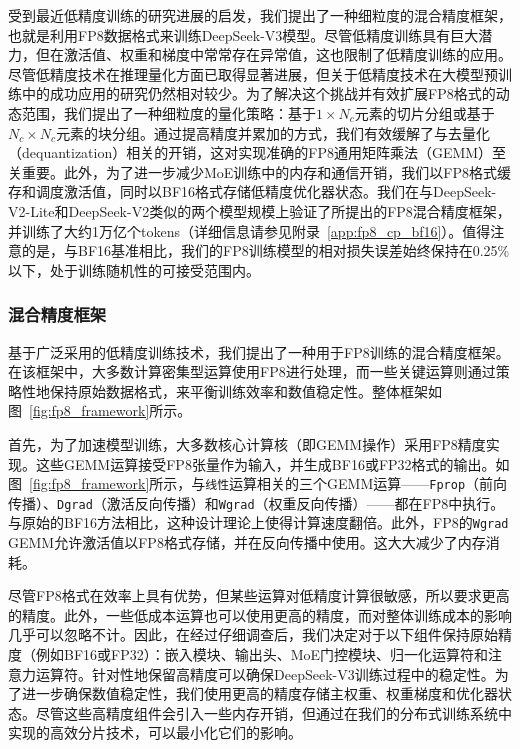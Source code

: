 \documentclass[lang=cn,a4paper,newtx]{elegantpaper}
\newcommand{\dsvii}{DeepSeek-V2}
\newcommand{\dsviii}{DeepSeek-V3}
\begin{document}
受到最近低精度训练的研究进展的启发，我们提出了一种细粒度的混合精度框架，也就是利用FP8数据格式来训练\dsviii{}模型。尽管低精度训练具有巨大潜力，但在激活值、权重和梯度中常常存在异常值，这也限制了低精度训练的应用。尽管低精度技术在推理量化方面已取得显著进展，但关于低精度技术在大模型预训练中的成功应用的研究仍然相对较少。为了解决这个挑战并有效扩展FP8格式的动态范围，我们提出了一种细粒度的量化策略：基于$1\times N_c$元素的切片分组或基于$N_c\times N_c$元素的块分组。通过提高精度并累加的方式，我们有效缓解了与去量化（dequantization）相关的开销，这对实现准确的FP8通用矩阵乘法（GEMM）至关重要。此外，为了进一步减少MoE训练中的内存和通信开销，我们以FP8格式缓存和调度激活值，同时以BF16格式存储低精度优化器状态。我们在与\dsvii{}-Lite和\dsvii{}类似的两个模型规模上验证了所提出的FP8混合精度框架，并训练了大约1万亿个tokens（详细信息请参见附录~\ref{app:fp8_cp_bf16}）。值得注意的是，与BF16基准相比，我们的FP8训练模型的相对损失误差始终保持在0.25\%以下，处于训练随机性的可接受范围内。

\subsubsection{混合精度框架}

基于广泛采用的低精度训练技术，我们提出了一种用于FP8训练的混合精度框架。在该框架中，大多数计算密集型运算使用FP8进行处理，而一些关键运算则通过策略性地保持原始数据格式，来平衡训练效率和数值稳定性。整体框架如图~\ref{fig:fp8_framework}所示。

首先，为了加速模型训练，大多数核心计算核（即GEMM操作）采用FP8精度实现。这些GEMM运算接受FP8张量作为输入，并生成BF16或FP32格式的输出。如图~\ref{fig:fp8_framework}所示，与\texttt{线性}运算相关的三个GEMM运算——\texttt{Fprop}（前向传播）、\texttt{Dgrad}（激活反向传播）和\texttt{Wgrad}（权重反向传播）——都在FP8中执行。与原始的BF16方法相比，这种设计理论上使得计算速度翻倍。此外，FP8的\texttt{Wgrad} GEMM允许激活值以FP8格式存储，并在反向传播中使用。这大大减少了内存消耗。

尽管FP8格式在效率上具有优势，但某些运算对低精度计算很敏感，所以要求更高的精度。此外，一些低成本运算也可以使用更高的精度，而对整体训练成本的影响几乎可以忽略不计。因此，在经过仔细调查后，我们决定对于以下组件保持原始精度（例如BF16或FP32）：嵌入模块、输出头、MoE门控模块、归一化运算符和注意力运算符。针对性地保留高精度可以确保\dsviii{}训练过程中的稳定性。为了进一步确保数值稳定性，我们使用更高的精度存储主权重、权重梯度和优化器状态。尽管这些高精度组件会引入一些内存开销，但通过在我们的分布式训练系统中实现的高效分片技术，可以最小化它们的影响。
\end{document}
